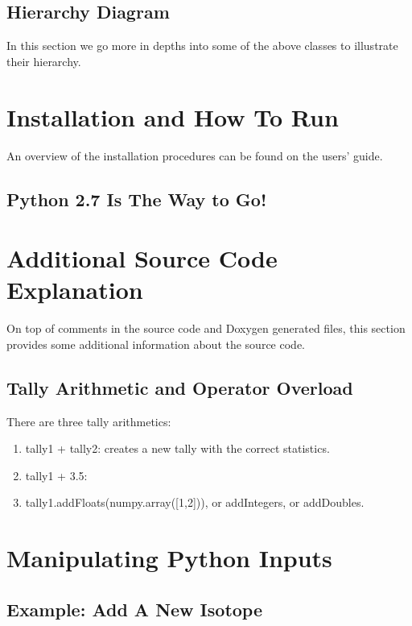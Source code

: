 \documentclass[titlepage]{article}
\begin{document}
\clearpage
\subsection{Hierarchy Diagram}
In this section we go more in depths into some of the above classes to illustrate their hierarchy. 

\clearpage
\section{Installation and How To Run} 
An overview of the installation procedures can be found on the users' guide. 



\clearpage
\subsection{Python 2.7 Is The Way to Go!}



\clearpage
\section{Additional Source Code Explanation}
On top of comments in the source code and Doxygen generated files, this section provides some additional information about the source code. 


\clearpage
\subsection{Tally Arithmetic and Operator Overload}
There are three tally arithmetics: 
\begin{enumerate}
\item tally1 + tally2: creates a new tally with the correct statistics. 
\item tally1 + 3.5:
\item tally1.addFloats(numpy.array([1,2])), or addIntegers, or addDoubles. 
\end{enumerate}





\clearpage
\section{Manipulating Python Inputs}
\subsection{Example: Add A New Isotope}
\end{document}
